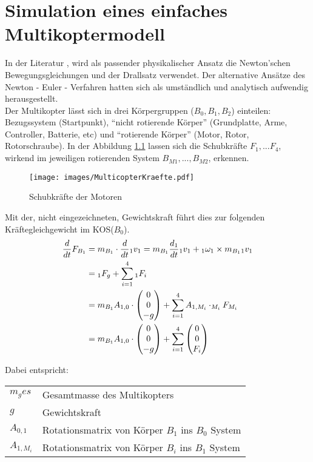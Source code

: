 \chapter{Simulation eines einfaches Multikoptermodell}\label{chap:simpleModel}
In der Literatur \cite{LQR2013}, \cite{mathModell} wird als passender physikalischer Ansatz die Newton'schen Bewegungsgleichungen und der Drallsatz verwendet. Der alternative Ansätze des Newton - Euler - Verfahren \cite[S. 36]{Sose2014} hatten sich als umständlich und analytisch aufwendig herausgestellt. \\

Der Multikopter lässt sich in drei Körpergruppen ($B_0, B_1, B_2$) einteilen: Bezugssystem (Startpunkt), ``nicht rotierende Körper'' (Grundplatte, Arme, Controller, Batterie, etc) und ``rotierende Körper'' (Motor, Rotor, Rotorschraube). In der Abbildung \ref{fig:schubkraefte} lassen sich die Schubkräfte $F_1, ... F_4$, wirkend im jeweiligen rotierenden System $B_{M1}, ..., B_{M2}$, erkennen. 
\begin{figure}[ht]
  \centering
  \texttt{[image: images/MulticopterKraefte.pdf]}
  \caption{Schubkräfte der Motoren}
  \label{fig:schubkraefte}
\end{figure}
Mit der, nicht eingezeichneten, Gewichtskraft führt dies zur folgenden Kräftegleichgewicht im KOS($B_0$).
\begin{align}
    \frac{d}{dt} F_{B_1} &= m_{B_1} \cdot \frac{d}{dt} {_{1}v_{1}} = m_{B_1} \frac{d_1}{dt} {_{1}v_{1}} + {_{1}\omega_{1}} \times m_{B_1} {_{1}v_{1}} \\
    &=  {_{1}F_g} + \sum_{i = 1}^{4}{_{1}F_{i}}  \\\notag
    &= m_{B_1} A_{1, 0} \cdot \begin{pmatrix} 0 \\ 0 \\ -g \end{pmatrix} + \sum_{i = 1}^4 {A_{1, M_i} \cdot _{M_i}F_{M_i}} \\
    &= m_{B_1} A_{1, 0} \cdot \begin{pmatrix} 0 \\ 0 \\ -g \end{pmatrix} + \sum_{i = 1}^4 {\begin{pmatrix} 0 \\ 0 \\ F_i \end{pmatrix}}
\end{align}

Dabei entspricht:\\
\begin{tabular}[t]{|l|l|}
  \hline
  $m_ges$ & Gesamtmasse des Multikopters \\ 
  $g$     & Gewichtskraft \\
  $A_{0,1}$ & Rotationsmatrix von Körper $B_1$ ins $B_0$ System \\
  $A_{1,M_i}$ & Rotationsmatrix von Körper $B_i$ ins $B_1$ System \\
  \hline
\end{tabular}\\

